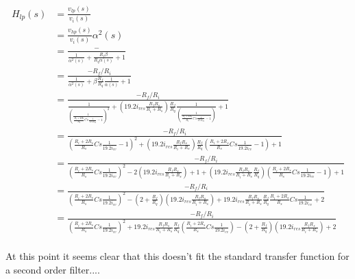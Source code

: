 \documentclass{article}
\begin{document}
\begin{equation*}
\begin{split}
  H_{lp}(s) & = \frac{v_{lp}(s)}{v_i(s)} \\
            & = \frac{v_{hp}(s)}{v_i(s)}\alpha^2(s) \\
            & = \frac{-}{\frac{1}{\alpha^2(s)} + \frac{R_f\beta}{R_q\alpha(s)} + 1 } \\
            & = \frac{-R_f/R_i}{\frac{1}{\alpha^2(s)} + \beta\frac{R_f}{R_q}\frac{1}{\alpha(s)} + 1 } \\
            & = \frac{-R_f/R_i}{\frac{1}{(\frac{1}{\frac{{R_i} + 2{R_s}}{R_s}Cs\frac{1}{19.2i_{cv}} - 1})^2} + (19.2i_{res}\frac{R_fR_s}{R_i + R_s})\frac{R_f}{R_q}\frac{1}{(\frac{1}{\frac{{R_i} + 2{R_s}}{R_s}Cs\frac{1}{19.2i_{cv}} - 1})} + 1 } \\
            & = \frac{-R_f/R_i}{(\frac{{R_i} + 2{R_s}}{R_s}Cs\frac{1}{19.2i_{cv}} - 1)^2 + (19.2i_{res}\frac{R_fR_s}{R_i + R_s})\frac{R_f}{R_q}(\frac{{R_i} + 2{R_s}}{R_s}Cs\frac{1}{19.2i_{cv}} - 1) + 1 } \\
            & = \frac{-R_f/R_i}{(\frac{{R_i} + 2{R_s}}{R_s}Cs\frac{1}{19.2i_{cv}})^2 - 2(19.2i_{res}\frac{R_fR_s}{R_i + R_s}) + 1 + (19.2i_{res}\frac{R_fR_s}{R_i + R_s}\frac{R_f}{R_q})(\frac{{R_i} + 2{R_s}}{R_s}Cs\frac{1}{19.2i_{cv}} - 1) + 1 } \\
            & = \frac{-R_f/R_i}{(\frac{{R_i} + 2{R_s}}{R_s}Cs\frac{1}{19.2i_{cv}})^2 - (2 + \frac{R_f}{R_q})(19.2i_{res}\frac{R_fR_s}{R_i + R_s}) + 19.2i_{res}\frac{R_fR_s}{R_i + R_s}\frac{R_f}{R_q}\frac{{R_i} + 2{R_s}}{R_s}Cs\frac{1}{19.2i_{cv}} + 2 } \\
            & = \frac{-R_f/R_i}{(\frac{{R_i} + 2{R_s}}{R_s}Cs\frac{1}{19.2i_{cv}})^2 + 19.2i_{res}\frac{R_fR_s}{R_i + R_s}\frac{R_f}{R_q}(\frac{{R_i} + 2{R_s}}{R_s}Cs\frac{1}{19.2i_{cv}}) - (2 + \frac{R_f}{R_q})(19.2i_{res}\frac{R_fR_s}{R_i + R_s}) + 2 } \\
\end{split}
\end{equation*}

At this point it seems clear that this doesn't fit the standard transfer function for a second order filter....
\end{document}
